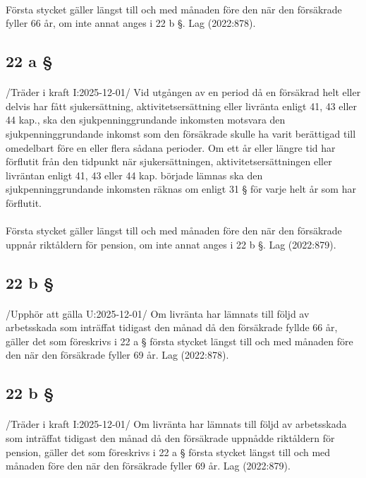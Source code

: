 \documentclass[a4paper,notitlepage,openany,10pt]{book}
\begin{document}
\paragraph*{}
Första stycket gäller längst till och med månaden före den när den försäkrade fyller 66 år, om inte annat anges i 22 b §.
Lag (2022:878).
\subsection*{22 a §}
\paragraph*{}
/Träder i kraft I:2025-12-01/
Vid utgången av en period då en försäkrad helt eller delvis har fått sjukersättning, aktivitetsersättning eller livränta enligt 41, 43 eller 44 kap., ska den sjukpenninggrundande inkomsten motsvara den sjukpenninggrundande inkomst som den försäkrade skulle ha varit berättigad till omedelbart före en eller flera sådana perioder. Om ett år eller längre tid har förflutit från den tidpunkt när sjukersättningen, aktivitetsersättningen eller livräntan enligt 41, 43 eller 44 kap. började lämnas ska den sjukpenninggrundande inkomsten räknas om enligt 31 § för varje helt år som har förflutit.
\paragraph*{}
Första stycket gäller längst till och med månaden före den när den försäkrade uppnår riktåldern för pension, om inte annat anges i 22 b §.
Lag (2022:879).
\subsection*{22 b §}
\paragraph*{}
/Upphör att gälla U:2025-12-01/
Om livränta har lämnats till följd av arbetsskada som inträffat tidigast den månad då den försäkrade fyllde 66 år, gäller det som föreskrivs i 22 a § första stycket längst till och med månaden före den när den försäkrade fyller 69 år.
Lag (2022:878).
\subsection*{22 b §}
\paragraph*{}
/Träder i kraft I:2025-12-01/
Om livränta har lämnats till följd av arbetsskada som inträffat tidigast den månad då den försäkrade uppnådde riktåldern för pension, gäller det som föreskrivs i 22 a § första stycket längst till och med månaden före den när den försäkrade fyller 69 år.
Lag (2022:879).
\end{document}
